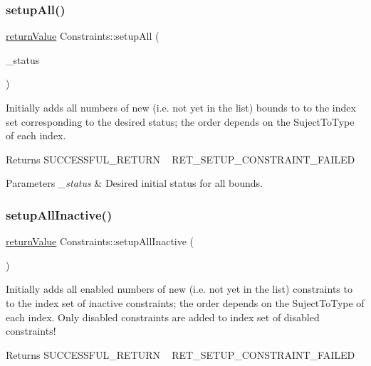 \subsubsection{\texorpdfstring{setup\+All()}{setupAll()}}
{\footnotesize\ttfamily \hyperlink{_message_handling_8hpp_a81d556f613bfbabd0b1f9488c0fa865e}{return\+Value} Constraints\+::setup\+All (\begin{DoxyParamCaption}\item[{\hyperlink{_types_8hpp_a70a6a40d261a015ead8d43aa589383a4}{Subject\+To\+Status}}]{\+\_\+status }\end{DoxyParamCaption})\hspace{0.3cm}{\ttfamily [protected]}}

Initially adds all numbers of new (i.\+e. not yet in the list) bounds to to the index set corresponding to the desired status; the order depends on the Suject\+To\+Type of each index. \begin{DoxyReturn}{Returns}
S\+U\+C\+C\+E\+S\+S\+F\+U\+L\+\_\+\+R\+E\+T\+U\+RN ~\newline
 R\+E\+T\+\_\+\+S\+E\+T\+U\+P\+\_\+\+C\+O\+N\+S\+T\+R\+A\+I\+N\+T\+\_\+\+F\+A\+I\+L\+ED 
\end{DoxyReturn}

\begin{DoxyParams}{Parameters}
{\em \+\_\+status} & Desired initial status for all bounds. \\
\hline
\end{DoxyParams}
\mbox{\label{class_constraints_ac49c5bae8433f8c6623e55088f33d226}} 
\subsubsection{\texorpdfstring{setup\+All\+Inactive()}{setupAllInactive()}}
{\footnotesize\ttfamily \hyperlink{_message_handling_8hpp_a81d556f613bfbabd0b1f9488c0fa865e}{return\+Value} Constraints\+::setup\+All\+Inactive (\begin{DoxyParamCaption}{ }\end{DoxyParamCaption})}

Initially adds all enabled numbers of new (i.\+e. not yet in the list) constraints to to the index set of inactive constraints; the order depends on the Suject\+To\+Type of each index. Only disabled constraints are added to index set of disabled constraints! \begin{DoxyReturn}{Returns}
S\+U\+C\+C\+E\+S\+S\+F\+U\+L\+\_\+\+R\+E\+T\+U\+RN ~\newline
 R\+E\+T\+\_\+\+S\+E\+T\+U\+P\+\_\+\+C\+O\+N\+S\+T\+R\+A\+I\+N\+T\+\_\+\+F\+A\+I\+L\+ED 
\end{DoxyReturn}
\mbox{\label{class_constraints_a0bc777ba851991829a569edcc444d004}} 
